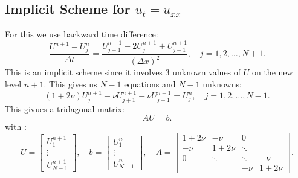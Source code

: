 \documentclass[../main/main.tex]{subfiles}
\begin{document}
\subsection{Implicit Scheme for $u_t = u_{ x x}$}
For this we use backward time difference: \[
    \frac{U^{n+1}-U^n_j}{\Delta t} = \frac{U^{n+1}_{j+1}-2U^{n+1}_j + U^{n+1}_{j-1}}{(\Delta x)^2}, \quad j = 1,2, \ldots,N+1
.\] This is an implicit scheme since it involves 3 unknown values of $U$ on the new level $n+1$. This gives us $N-1$ equations and $N-1$ unknowns: \[
(1+2\nu) U^{n+1}_j - \nu U^{n+1}_{j+1} - \nu U^{n+1}_{j-1} = U^n_j, \quad j = 1,2,\ldots, N-1
.\] This givues a tridagonal matrix: \[
AU = b
.\] with : \[
U = \begin{bmatrix} U_1^{n+1}\\ \vdots\\ U^{n+1}_{N-1} \end{bmatrix}, \quad b = \begin{bmatrix} U^n_1 \\ \vdots \\ U^n_{N-1} \end{bmatrix} , \quad A = \begin{bmatrix} 1+2\nu & - \nu &0 & \\ -\nu & 1+2\nu  & \ddots & \\ 0 &\ddots & \ddots& -\nu \\ & & -\nu & 1+ 2\nu \end{bmatrix} 
.\] 
\end{document}
